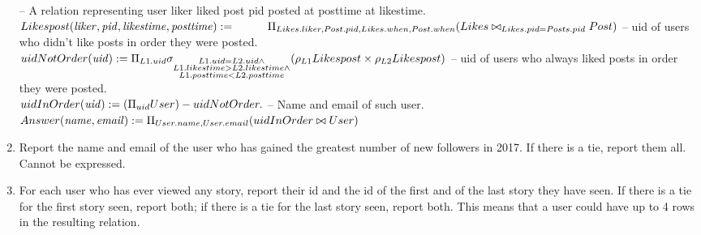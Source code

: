 \documentclass{article}
\newcommand{\var}[1]{\mathit{#1}}
\begin{document}
\begin{enumerate}
{\large
-- A relation representing user liker liked post pid posted at posttime at likestime. \\[5pt]
$
Likespost(\var{liker, pid, likestime, posttime}) := \\[5pt]
	\hspace*{1cm}
	\Pi_{Likes.liker, Post.pid, Likes.when, Post.when}
	(Likes \bowtie_{Likes.pid=Posts.pid} Post) \\[10 pt]
$
-- uid of users who didn't like posts in order they were posted. \\[5pt]
$
uidNotOrder(\var{uid}) :=
	\Pi_{L1.uid}
	\sigma_{\substack{L1.uid = L2.uid \wedge \\ L1.likestime > L2.likestime \wedge \\ L1.posttime < L2.posttime}}
	(\rho_{L1} Likespost \times \rho_{L2} Likespost) \\[10pt]
$
-- uid of users who always liked posts in order they were posted. \\[5pt]
$
uidInOrder(\var{uid}) := 
	(\Pi_{uid} User) - uidNotOrder. \\[10pt]
$
-- Name and email of such user. \\[5pt]
$
Answer(\var{name, email}) := 
	\Pi_{User.name, User.email}
	(uidInOrder \bowtie User) \\[10pt]
$
}

\item   %
Report the name and email of the user
who has gained the greatest number of new followers in 2017. 
If there is a tie, report them all. \\

{\large
Cannot be expressed. \\[10pt]
}

\item   %
For each user who has ever viewed any story, 
	report their id and the id of the first and of the last story they have seen.
If there is a tie for the first story seen, report both;
if there is a tie for the last story seen, report both.
This means that a user could have up to 4 rows in the resulting relation. \\


\end{enumerate}
\end{document}
